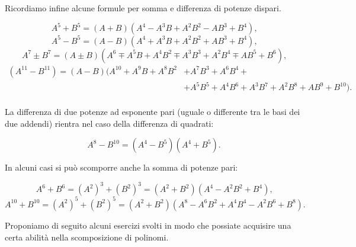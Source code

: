 Ricordiamo infine alcune formule per somma e differenza di potenze
dispari.

\[A^5+B^5=(A+B)\left(A^4-A^3B+A^2B^2-AB^3+B^4\right)\text{,}\]
\[A^5-B^5=(A-B)\left(A^4+A^3B+A^2B^2+AB^3+B^4\right)\text{,}\]
\[A^{7}\pm B^{7}=(A\pm B)\left(A^{6}\mp A^{5}B+A^{4}B^{2}\mp A^{3}B^{3}+A^{2}B^{4}\mp AB^{5}+B^{6}\right)\text{,}\]
\begin{equation*}
\begin{split}
 (A^{11}-B^{11})=(A-B)(A^{10}+A^{9}B+A^{8}B^{2}&+A^{7}B^{3}+A^{6}B^{4}+\\
 &+A^{5}B^{5}+A^{4}B^{6}+A^{3}B^{7}+A^{2}B^{8}+AB^{9}+B^{10}).\\
\end{split}
\end{equation*}

La differenza di due potenze ad esponente pari (uguale o differente tra le basi dei due addendi)
rientra nel caso della differenza di quadrati:

\[A^{8}-B^{10}=\left(A^{4}-B^{5}\right)\left(A^{4}+B^{5}\right).\]

In alcuni casi si può scomporre anche la somma di potenze pari:

\[A^{6}+B^{6}=\left(A^{2}\right)^{3}+\left(B^{2}\right)^{3}=\left(A^{2}+B^{2}\right)\left(A^{4}-A^{2}B^{2}+B^{4}\right)\text{,}\]
\[A^{10}+B^{10}=\left(A^{2}\right)^{5}+\left(B^{2}\right)^{5}=\left(A^{2}+B^{2}\right)\left(A^{8}-A^{6}B^{2}+A^{4}B^{4}-A^2B^6+B^8\right).\]
\pagebreak

Proponiamo di seguito alcuni esercizi svolti in modo che
possiate acquisire una certa abilità nella scomposizione di polinomi.


